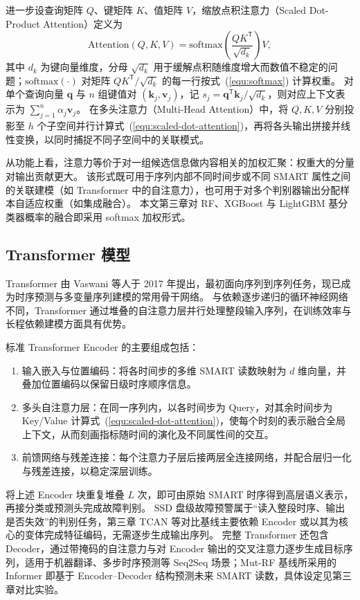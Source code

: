 进一步设查询矩阵 $Q$、键矩阵 $K$、值矩阵 $V$，缩放点积注意力（Scaled Dot-Product Attention）定义为
\begin{equation}
\label{equ:scaled-dot-attention}
\mathrm{Attention}(Q,K,V)=\mathrm{softmax}\!\left(\frac{QK^{\mathsf{T}}}{\sqrt{d_k}}\right)V,
\end{equation}
其中 $d_k$ 为键向量维度，分母 $\sqrt{d_k}$ 用于缓解点积随维度增大而数值不稳定的问题；$\mathrm{softmax}(\cdot)$ 对矩阵 $QK^{\mathsf{T}}/\sqrt{d_k}$ 的每一行按式~(\ref{equ:softmax}) 计算权重。
对单个查询向量 $\mathbf{q}$ 与 $n$ 组键值对 $(\mathbf{k}_j,\mathbf{v}_j)$，记 $s_j=\mathbf{q}^{\mathsf{T}}\mathbf{k}_j/\sqrt{d_k}$，则对应上下文表示为 $\sum_{j=1}^{n}\alpha_j\mathbf{v}_j$。
在多头注意力（Multi-Head Attention）中，将 $Q,K,V$ 分别投影至 $h$ 个子空间并行计算式~(\ref{equ:scaled-dot-attention})，再将各头输出拼接并线性变换，以同时捕捉不同子空间中的关联模式。

从功能上看，注意力等价于对一组候选信息做内容相关的加权汇聚：权重大的分量对输出贡献更大。
该形式既可用于序列内部不同时间步或不同 SMART 属性之间的关联建模（如 Transformer 中的自注意力），也可用于对多个判别器输出分配样本自适应权重（如集成融合）。
本文第三章对 RF、XGBoost 与 LightGBM 基分类器概率的融合即采用 softmax 加权形式。

\subsection{Transformer 模型}

Transformer 由 Vaswani 等人于 2017 年提出，最初面向序列到序列任务，现已成为时序预测与多变量序列建模的常用骨干网络\cite{vaswani2017attention}。
与依赖逐步递归的循环神经网络不同，Transformer 通过堆叠的自注意力层并行处理整段输入序列，在训练效率与长程依赖建模方面具有优势。

标准 Transformer Encoder 的主要组成包括：
\begin{enumerate}
    \item 输入嵌入与位置编码：将各时间步的多维 SMART 读数映射为 $d$ 维向量，并叠加位置编码以保留日级时序顺序信息。
    \item 多头自注意力层：在同一序列内，以各时间步为 Query，对其余时间步为 Key/Value 计算式~(\ref{equ:scaled-dot-attention})，使每个时刻的表示融合全局上下文，从而刻画指标随时间的演化及不同属性间的交互。
    \item 前馈网络与残差连接：每个注意力子层后接两层全连接网络，并配合层归一化与残差连接，以稳定深层训练。
\end{enumerate}

将上述 Encoder 块重复堆叠 $L$ 次，即可由原始 SMART 时序得到高层语义表示，再接分类或预测头完成故障判别。
SSD 盘级故障预警属于“读入整段时序、输出是否失效”的判别任务，第三章 TCAN 等对比基线主要依赖 Encoder 或以其为核心的变体完成特征编码，无需逐步生成输出序列\cite{koh2024temporal}。
完整 Transformer 还包含 Decoder，通过带掩码的自注意力与对 Encoder 输出的交叉注意力逐步生成目标序列，适用于机器翻译、多步时序预测等 Seq2Seq 场景；Mut-RF 基线所采用的 Informer 即基于 Encoder--Decoder 结构预测未来 SMART 读数\cite{zhou2021informer,zhang2024msfrd}，具体设定见第三章对比实验。

